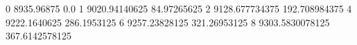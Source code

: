 0 8935.96875 0.0
1 9020.94140625 84.97265625
2 9128.677734375 192.708984375
4 9222.1640625 286.1953125
6 9257.23828125 321.26953125
8 9303.5830078125 367.6142578125
